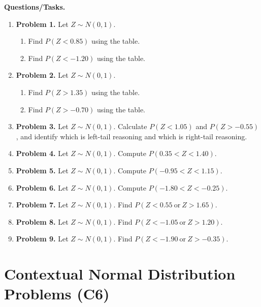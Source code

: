 	\textbf{Questions/Tasks.}
	\begin{enumerate}
	\item \textbf{Problem 1.} Let \(Z\sim N(0,1)\).
	\begin{enumerate}
		\item Find \(P(Z<0.85)\) using the table.
		\item Find \(P(Z<-1.20)\) using the table.
	\end{enumerate}
	
	\item \textbf{Problem 2.} Let \(Z\sim N(0,1)\).
	\begin{enumerate}
		\item Find \(P(Z>1.35)\) using the table.
		\item Find \(P(Z>-0.70)\) using the table.
	\end{enumerate}
	
	\item \textbf{Problem 3.} Let \(Z\sim N(0,1)\). Calculate \(P(Z<1.05)\) and \(P(Z>-0.55)\), and identify which is left-tail reasoning and which is right-tail reasoning.
	
	\item \textbf{Problem 4.} Let \(Z\sim N(0,1)\). Compute \(P(0.35<Z<1.40)\).
	
	\item \textbf{Problem 5.} Let \(Z\sim N(0,1)\). Compute \(P(-0.95<Z<1.15)\).
	
	\item \textbf{Problem 6.} Let \(Z\sim N(0,1)\). Compute \(P(-1.80<Z<-0.25)\).
	
	\item \textbf{Problem 7.} Let \(Z\sim N(0,1)\). Find \(P(Z<0.55\ \text{or}\ Z>1.65)\).
	
	\item \textbf{Problem 8.} Let \(Z\sim N(0,1)\). Find \(P(Z<-1.05\ \text{or}\ Z>1.20)\).
	
	\item \textbf{Problem 9.} Let \(Z\sim N(0,1)\). Find \(P(Z<-1.90\ \text{or}\ Z>-0.35)\).
	\end{enumerate}
	
	\section{Contextual Normal Distribution Problems (C6)}
	\label{sec:contextual-normal-distribution-problems-c6}
	

